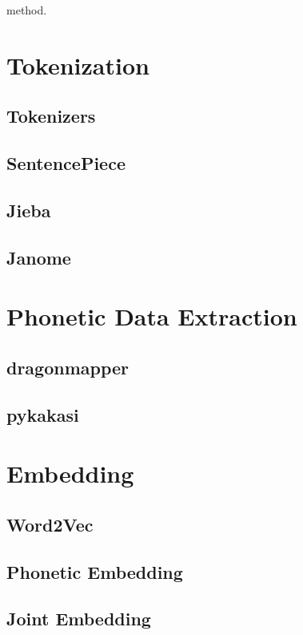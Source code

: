 \hspace{24pt}

method.

\section{Tokenization} \label{sec:tokenization}
\subsection{Tokenizers} \label{sec:tokenizers}
\subsection{SentencePiece} \label{sec:sentencepiece}
\subsection{Jieba} \label{sec:jieba}
\subsection{Janome} \label{sec:janome}

\section{Phonetic Data Extraction} \label{sec:phonetic_data}
\subsection{dragonmapper} \label{sec:dragonmapper}
\subsection{pykakasi} \label{sec:pykakasi}

\section{Embedding} \label{sec:embedding}
\subsection{Word2Vec} \label{sec:word2vec}
\subsection{Phonetic Embedding} \label{sec:phonetic_embedding}
\subsection{Joint Embedding} \label{sec:joint_embedding}

